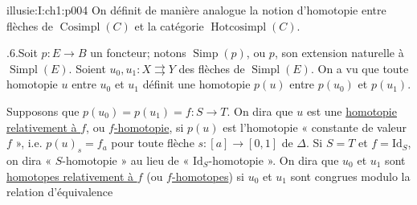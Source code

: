 \begin{illusiebodypage}{illusie:I:ch1:p004}
\hypertarget{illusie:I:ch1:s1:1:p12}{}%
On définit de manière analogue la notion d'homotopie entre flèches de
$\operatorname{Cosimpl}(C)$ et la catégorie $\operatorname{Hotcosimpl}(C)$.

\hypertarget{illusie:I:ch1:s1:1:p13}{}%
.6.\quad Soit $p:E\longrightarrow B$ un foncteur; notons
$\operatorname{Simp}(p)$, ou $p$, son extension naturelle à
$\operatorname{Simpl}(E)$. Soient $u_0,u_1:X\rightrightarrows Y$ des flèches
de $\operatorname{Simpl}(E)$. On a vu que toute homotopie $u$ entre $u_0$ et
$u_1$ définit une homotopie $p(u)$ entre $p(u_0)$ et $p(u_1)$.

\hypertarget{illusie:I:ch1:s1:1:p14}{}%
Supposons que $p(u_0)=p(u_1)=f:S\longrightarrow T$. On dira que $u$ est une
\underline{homotopie relativement à $f$}, ou \underline{$f$-homotopie}, si
$p(u)$ est l'homotopie « constante de valeur $f$ », i.e.
$p(u)_s=f_a$ pour toute flèche $s:[a]\longrightarrow[0,1]$ de $\Delta$. Si
$S=T$ et $f=\mathrm{Id}_S$, on dira « $S$-homotopie » au lieu de
« $\mathrm{Id}_S$-homotopie ». On dira que $u_0$ et $u_1$ sont
\underline{homotopes relativement à $f$} (ou \underline{$f$-homotopes}) si
$u_0$ et $u_1$ sont congrues modulo la relation d'équivalence
\end{illusiebodypage}
